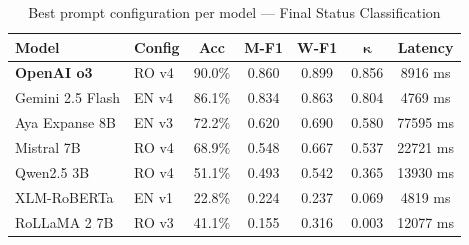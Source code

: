 \begin{table}[H]
\centering
\footnotesize
\caption{Best prompt configuration per model — Final Status Classification}
\label{tab:final-status-best}
\begin{tabular}{llccccc}
\toprule
\textbf{Model} & \textbf{Config} & \textbf{Acc} & \textbf{M-F1} & \textbf{W-F1} & $\boldsymbol{\kappa}$ & \textbf{Latency} \\
\midrule
\textbf{OpenAI o3} & RO v4 & 90.0\% & 0.860 & 0.899 & 0.856 & 8916 ms \\
Gemini 2.5 Flash & EN v4 & 86.1\% & 0.834 & 0.863 & 0.804 & 4769 ms \\
Aya Expanse 8B & EN v3 & 72.2\% & 0.620 & 0.690 & 0.580 & 77595 ms \\
Mistral 7B & RO v4 & 68.9\% & 0.548 & 0.667 & 0.537 & 22721 ms \\
Qwen2.5 3B & RO v4 & 51.1\% & 0.493 & 0.542 & 0.365 & 13930 ms \\
XLM-RoBERTa & EN v1 & 22.8\% & 0.224 & 0.237 & 0.069 & 4819 ms \\
RoLLaMA 2 7B & RO v3 & 41.1\% & 0.155 & 0.316 & 0.003 & 12077 ms \\
\bottomrule
\end{tabular}
\end{table}
